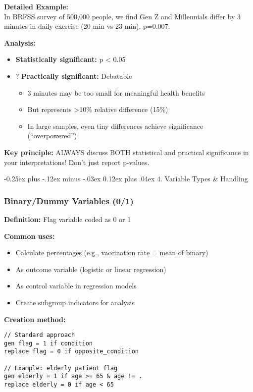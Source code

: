 ﻿\documentclass[8pt,letterpaper]{article}
\makeatletter
\renewcommand{\subsection}{\@startsection{subsection}{2}{0mm}%
                                {-0.25ex plus -.12ex minus -.03ex}%
                                {0.12ex plus .04ex}%
                                {\normalfont\fontsize{8pt}{8pt}\selectfont\bfseries\color{myblue}}}
\makeatother
\begin{document}
\begin{multicols}{2}
\textbf{Detailed Example:}\\
In BRFSS survey of 500,000 people, we find Gen Z and Millennials differ by 3 minutes in daily exercise (20 min vs 23 min), p=0.007.

\textbf{Analysis:}
\begin{itemize}
\item \checkmark \textbf{Statistically significant:} p < 0.05
\item ? \textbf{Practically significant:} Debatable
  \begin{itemize}
  \item 3 minutes may be too small for meaningful health benefits
  \item But represents >10\% relative difference (15\%)
  \item In large samples, even tiny differences achieve significance (``overpowered'')
  \end{itemize}
\end{itemize}

\textbf{Key principle:} ALWAYS discuss BOTH statistical and practical significance in your interpretations! Don't just report p-values.

\subsection{4. Variable Types \& Handling}

\subsubsection{Binary/Dummy Variables (0/1)}

\textbf{Definition:} Flag variable coded as 0 or 1

\textbf{Common uses:}
\begin{itemize}
\item Calculate percentages (e.g., vaccination rate = mean of binary)
\item As outcome variable (logistic or linear regression)
\item As control variable in regression models
\item Create subgroup indicators for analysis
\end{itemize}

\textbf{Creation method:}
\begin{lstlisting}
// Standard approach
gen flag = 1 if condition
replace flag = 0 if opposite_condition

// Example: elderly patient flag
gen elderly = 1 if age >= 65 & age != .
replace elderly = 0 if age < 65
\end{lstlisting}


\end{multicols}
\end{document}
